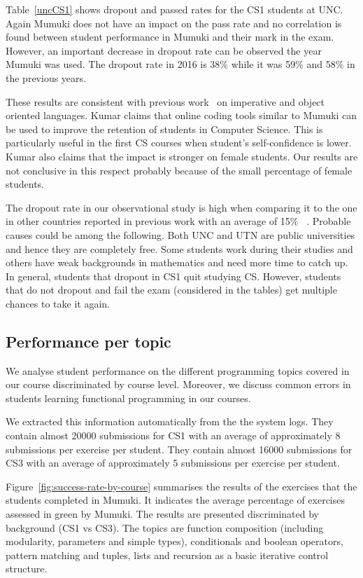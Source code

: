 Table~\ref{uncCS1} shows dropout and passed rates for the CS1 students at UNC. Again Mumuki does not have an impact on the pass rate and no correlation is found between student performance in Mumuki and their mark in the exam. However, an important decrease in dropout rate can be observed the year Mumuki was used. The dropout rate in 2016 is 38\% while it was 59\% and 58\% in the previous years.  

These results are consistent with previous work~\cite{Kumar:2008} on imperative and object oriented languages. Kumar claims that online coding tools similar to Mumuki can be used to improve the retention of students in Computer Science. This is particularly useful in the first CS courses when student's self-confidence is lower. Kumar also claims that the impact is stronger on female students. Our results are not conclusive in this respect probably because of the small percentage of female students. 

The dropout rate in our observational study is high when comparing it to the one in other countries reported in previous work with an
average of 15\% ~\cite{Watson:2014}. Probable causes could be among the following. Both UNC and UTN are public universities and hence they are completely free. Some students work during their studies and others have weak backgrounds in mathematics and need more time to catch up. In general, students that dropout in CS1 quit studying CS. However, students that do not dropout and fail the exam (considered in
the tables) get multiple chances to take it again.    

\subsection{Performance per topic}

We  analyse  student  performance on the different programming topics covered in our course  discriminated  by course level.   Moreover,  we  discuss  common errors in students learning functional programming in our courses. 

We extracted this information automatically from the the system logs. They contain almost 20000 submissions for CS1 with an average of approximately 8 submissions per exercise per student. They contain almost 16000 submissions for CS3 with an average of approximately 5 submissions per exercise per student.  

Figure~\ref{fig:success-rate-by-course} summarises the results of the exercises that the students completed in Mumuki. It indicates the average percentage of exercises assessed in green by Mumuki. The results are presented discriminated by background (CS1 vs CS3). The topics are function composition (including modularity, parameters and simple types), conditionals and boolean operators, pattern matching and tuples, lists and recursion as a basic iterative control structure. 

